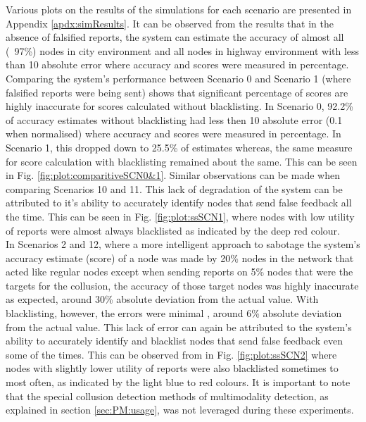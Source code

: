 \documentclass[journal]{IEEEtran}
\begin{document}
Various plots on the results of the simulations for each scenario are presented in Appendix \ref{apdx:simResults}. It can be observed from the results that in the absence of falsified reports, the system can estimate the accuracy of almost all (~97\%) nodes in city environment and all nodes in highway environment with less than 10 absolute error where accuracy and scores were measured in percentage.\\
Comparing the system's performance between Scenario 0 and Scenario 1 (where falsified reports were being sent) shows that significant percentage of scores are highly inaccurate for scores calculated without blacklisting. In Scenario 0, 92.2\% of accuracy estimates without blacklisting had less then 10 absolute error (0.1 when normalised) where accuracy and scores were measured in percentage. In Scenario 1, this dropped down to 25.5\% of estimates whereas, the same measure for score calculation with blacklisting remained about the same. This can be seen in Fig. \ref{fig:plot:comparitiveSCN0&1}. Similar observations can be made when comparing Scenarios 10 and 11. This lack of degradation of the system can be attributed to it's ability to accurately identify nodes that send false feedback all the time. This can be seen in Fig. \ref{fig:plot:ssSCN1}, where nodes with low utility of reports were almost always blacklisted as indicated by the deep red colour.\\
In Scenarios 2 and 12, where a more intelligent approach to sabotage the system's accuracy estimate (score) of a node was made by 20\% nodes in the network that acted like regular nodes except when sending reports on 5\% nodes that were the targets for the collusion, the accuracy of those target nodes was highly inaccurate as expected, %
around 30\% absolute deviation from the actual value.
With blacklisting, however, the errors were minimal %
, around 6\% absolute deviation from the actual value. This lack of error can again be attributed to the system's ability to accurately identify and blacklist nodes that send false feedback even some of the times. This can be observed from in Fig. \ref{fig:plot:ssSCN2} where nodes with slightly lower utility of reports were also blacklisted sometimes to most often, as indicated by the light blue to red colours. It is important to note that the special collusion detection methods of multimodality detection\cite{c:DipTest}\cite{c:SilvermansTest}, as explained in section \ref{sec:PM:usage}, was not leveraged during these experiments.
\end{document}
